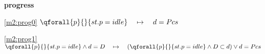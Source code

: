 \textbf{progress}
\begin{block}
\item[ \eqref{m2:prog0} ]{$\qforall{p}{}{st.p = idle}  \quad \mapsto\quad d = Pcs $} %
\item[ \eqref{m2:prog1} ]{$\qforall{p}{}{st.p = idle} \land d = D \quad \mapsto\quad (\qforall{p}{}{st.p = idle} \land D \subset d) \lor d = Pcs$} %
\end{block}
